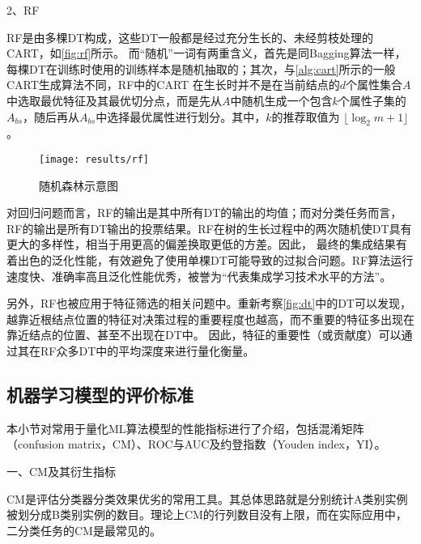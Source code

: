2、RF

RF是由多棵DT构成，这些DT一般都是经过充分生长的、未经剪枝处理的CART，如\autoref{fig:rf}所示。
而“随机”一词有两重含义，首先是同Bagging算法一样，每棵DT在训练时使用的训练样本是随机抽取的；其次，与\autoref{alg:cart}所示的一般CART生成算法不同，RF中的CART
在生长时并不是在当前结点的$d$个属性集合$A$中选取最优特征及其最优切分点，而是先从$A$中随机生成一个包含$k$个属性子集的$A_{bs}$，随后再从$A_{bs}$中选择最优属性进行划分\cite{Zhou2016,Liu2018,breiman2001}。其中，$k$的推荐取值为
$\lfloor \log_2m + 1 \rfloor$\cite{breiman2001}。

\begin{figure}[htbp]
    \centering
    \texttt{[image: results/rf]}
    \caption{\label{fig:rf}随机森林示意图}
\end{figure}

对回归问题而言，RF的输出是其中所有DT的输出的均值；而对分类任务而言，RF的输出是所有DT输出的投票结果。RF在树的生长过程中的两次随机使DT具有更大的多样性，相当于用更高的偏差换取更低的方差。因此，
最终的集成结果有着出色的泛化性能，有效避免了使用单棵DT可能导致的过拟合问题。RF算法运行速度快、准确率高且泛化性能优秀，被誉为“代表集成学习技术水平的方法”\cite{Zhou2016,Liu2018}。

另外，RF也被应用于特征筛选的相关问题中\cite{Aurélien2018}。重新考察\autoref{fig:dt}中的DT可以发现，越靠近根结点位置的特征对决策过程的重要程度也越高，而不重要的特征多出现在靠近结点的位置、甚至不出现在DT中。
因此，特征的重要性（或贡献度）可以通过其在RF众多DT中的平均深度来进行量化衡量。

\subsection{机器学习模型的评价标准}
本小节对常用于量化ML算法模型的性能指标进行了介绍，包括混淆矩阵（confusion matrix，CM）、ROC与AUC及约登指数（Youden index，YI）。

一、CM及其衍生指标

CM是评估分类器分类效果优劣的常用工具\cite{Zhou2016,Aurélien2018}。其总体思路就是分别统计A类别实例被划分成B类别实例的数目。理论上CM的行列数目没有上限，而在实际应用中，
二分类任务的CM是最常见的。

